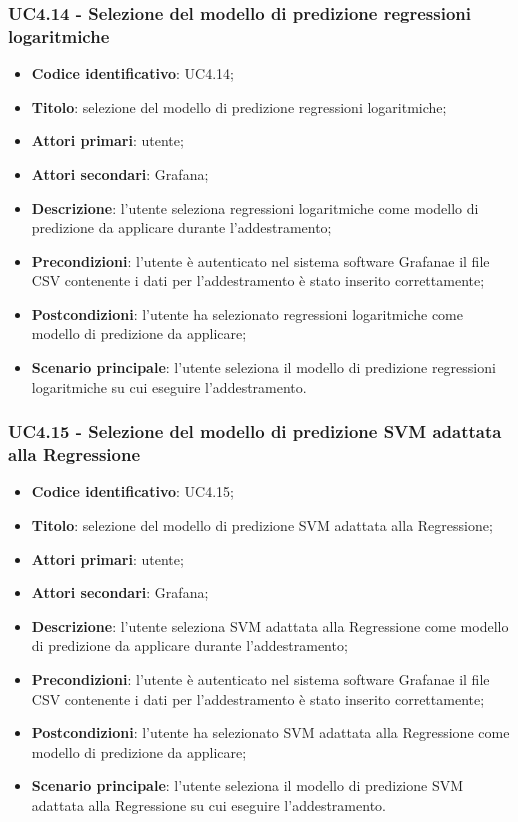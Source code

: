 \subsubsection{UC4.14 - Selezione del modello di predizione regressioni logaritmiche}
\begin{itemize}
	\item \textbf{Codice identificativo}: UC4.14;
	\item \textbf{Titolo}: selezione del modello di predizione regressioni logaritmiche;
	\item \textbf{Attori primari}: utente;
	\item \textbf{Attori secondari}: Grafana\glo;
	\item \textbf{Descrizione}: l'utente seleziona regressioni logaritmiche come modello di predizione da applicare durante l'addestramento;
	\item \textbf{Precondizioni}: l'utente è autenticato nel sistema software Grafana\glosp e il file CSV contenente i dati per l'addestramento è stato inserito correttamente;
	\item \textbf{Postcondizioni}: l'utente ha selezionato regressioni logaritmiche come modello di predizione da applicare;
	\item \textbf{Scenario principale}: l'utente seleziona il modello di predizione regressioni logaritmiche su cui eseguire l'addestramento.
\end{itemize}
\subsubsection{UC4.15 - Selezione del modello di predizione SVM adattata alla Regressione}
\begin{itemize}
	\item \textbf{Codice identificativo}: UC4.15;
	\item \textbf{Titolo}: selezione del modello di predizione SVM adattata alla Regressione;
	\item \textbf{Attori primari}: utente;
	\item \textbf{Attori secondari}: Grafana\glo;
	\item \textbf{Descrizione}: l'utente seleziona SVM adattata alla Regressione come modello di predizione da applicare durante l'addestramento;
	\item \textbf{Precondizioni}: l'utente è autenticato nel sistema software Grafana\glosp e il file CSV contenente i dati per l'addestramento è stato inserito correttamente;
	\item \textbf{Postcondizioni}: l'utente ha selezionato SVM adattata alla Regressione come modello di predizione da applicare;
	\item \textbf{Scenario principale}: l'utente seleziona il modello di predizione SVM adattata alla Regressione su cui eseguire l'addestramento.
\end{itemize}
